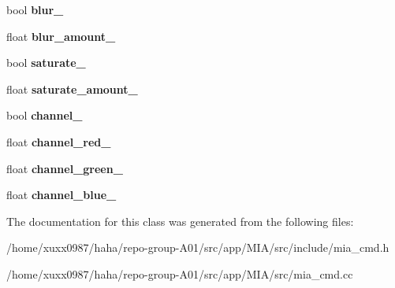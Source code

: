 \begin{DoxyCompactItemize}
\item 
bool {\bfseries blur\+\_\+}\hypertarget{classimage__tools_1_1MIACmd_a1ad109c055bac5da7ff707ecb6ee4bb3}{}\label{classimage__tools_1_1MIACmd_a1ad109c055bac5da7ff707ecb6ee4bb3}

\item 
float {\bfseries blur\+\_\+amount\+\_\+}\hypertarget{classimage__tools_1_1MIACmd_adba3259e048f611a2ba1e3256d8031c1}{}\label{classimage__tools_1_1MIACmd_adba3259e048f611a2ba1e3256d8031c1}

\item 
bool {\bfseries saturate\+\_\+}\hypertarget{classimage__tools_1_1MIACmd_a181eafab327d60a06c9f942fb9226350}{}\label{classimage__tools_1_1MIACmd_a181eafab327d60a06c9f942fb9226350}

\item 
float {\bfseries saturate\+\_\+amount\+\_\+}\hypertarget{classimage__tools_1_1MIACmd_a0bfea18323de6466db1eb9c0cfd55e32}{}\label{classimage__tools_1_1MIACmd_a0bfea18323de6466db1eb9c0cfd55e32}

\item 
bool {\bfseries channel\+\_\+}\hypertarget{classimage__tools_1_1MIACmd_aa16f4825c353ee69682151d2b55eb94d}{}\label{classimage__tools_1_1MIACmd_aa16f4825c353ee69682151d2b55eb94d}

\item 
float {\bfseries channel\+\_\+red\+\_\+}\hypertarget{classimage__tools_1_1MIACmd_a2d75a397d9cea2bd6560deaae3958aad}{}\label{classimage__tools_1_1MIACmd_a2d75a397d9cea2bd6560deaae3958aad}

\item 
float {\bfseries channel\+\_\+green\+\_\+}\hypertarget{classimage__tools_1_1MIACmd_a6d0e2829c4ad542f3131ae27dab40552}{}\label{classimage__tools_1_1MIACmd_a6d0e2829c4ad542f3131ae27dab40552}

\item 
float {\bfseries channel\+\_\+blue\+\_\+}\hypertarget{classimage__tools_1_1MIACmd_a5c3282076354eabd0fe26216afd6e54e}{}\label{classimage__tools_1_1MIACmd_a5c3282076354eabd0fe26216afd6e54e}

\end{DoxyCompactItemize}


The documentation for this class was generated from the following files\+:\begin{DoxyCompactItemize}
\item 
/home/xuxx0987/haha/repo-\/group-\/\+A01/src/app/\+M\+I\+A/src/include/mia\+\_\+cmd.\+h\item 
/home/xuxx0987/haha/repo-\/group-\/\+A01/src/app/\+M\+I\+A/src/mia\+\_\+cmd.\+cc\end{DoxyCompactItemize}
